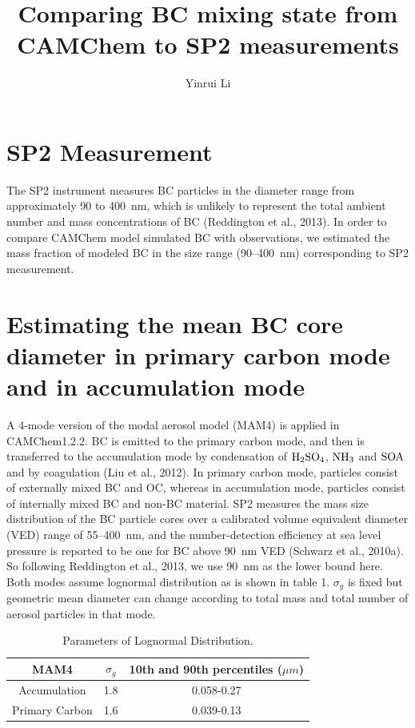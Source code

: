 \documentclass[11pt]{article}
\title{\textbf{Comparing BC mixing state from CAMChem to SP2 measurements}}
\author{Yinrui Li}
\date{}
\begin{document}
\maketitle



\section{SP2 Measurement} 

The SP2 instrument measures BC particles in the diameter range from approximately 90 to 400~nm, which is unlikely to represent the total ambient number and mass concentrations of BC (Reddington et al., 2013). 
In order to compare CAMChem model simulated BC with observations, we estimated the mass fraction of modeled BC in the size range (90--400~nm) corresponding to SP2 measurement.


 
\section{Estimating the mean BC core diameter in primary carbon mode and in accumulation mode} 

A 4-mode version of the modal aerosol model (MAM4) is applied in CAMChem1.2.2. BC is emitted to the primary carbon mode, and then is transferred to the accumulation mode by condensation of $\rm{H_2SO_4}$, $\rm{NH_3}$ and $\rm{SOA}$ and by coagulation (Liu et al., 2012). In primary carbon mode, particles consist of externally mixed BC and OC, whereas in accumulation mode, particles consist of internally mixed BC and non-BC material.
\bigskip
\noindent SP2 measures the mass size distribution of the BC particle cores over a calibrated volume equivalent diameter (VED) range of 55--400~nm, and the number-detection efficiency at sea level pressure is reported to be one for BC above 90~nm VED (Schwarz et al., 2010a). So following Reddington et al., 2013, we use 90~nm as the lower bound here. 
\bigskip
\noindent Both modes assume lognormal distribution as is shown in table 1. $\sigma_{g}$ is fixed but geometric mean diameter can change according to total mass and total number of aerosol particles in that mode.

\begin{table}
	\begin{center}
		\begin{tabular}{c|c|c}
			\hline  
			MAM4 & $\sigma_{g}$ &  10th and 90th percentiles ($\mu m$)		\\   \hline
			Accumulation  & 1.8  &   0.058-0.27 		\\ \hline
			Primary Carbon   & 1.6  &  0.039-0.13  		\\
			\hline			
		\end{tabular}
	\end{center}
\caption{\label{tab:ozone} Parameters of Lognormal Distribution.}
\end{table}
\end{document}
